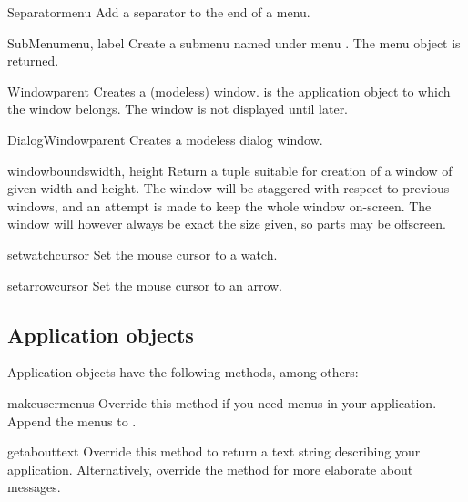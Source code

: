 \begin{funcdesc}{Separator}{menu}
Add a separator to the end of a menu.
\end{funcdesc}

\begin{funcdesc}{SubMenu}{menu, label}
Create a submenu named  under menu . The menu
object is returned.
\end{funcdesc}

\begin{funcdesc}{Window}{parent}
Creates a (modeless) window.  is the application object to
which the window belongs. The window is not displayed until later.
\end{funcdesc}

\begin{funcdesc}{DialogWindow}{parent}
Creates a modeless dialog window.
\end{funcdesc}

\begin{funcdesc}{windowbounds}{width, height}
Return a  tuple suitable for creation
of a window of given width and height. The window will be staggered
with respect to previous windows, and an attempt is made to keep the
whole window on-screen. The window will however always be exact the
size given, so parts may be offscreen.
\end{funcdesc}

\begin{funcdesc}{setwatchcursor}{}
Set the mouse cursor to a watch.
\end{funcdesc}

\begin{funcdesc}{setarrowcursor}{}
Set the mouse cursor to an arrow.
\end{funcdesc}

\subsection{Application objects}
Application objects have the following methods, among others:


\begin{funcdesc}{makeusermenus}{}
Override this method if you need menus in your application. Append the
menus to .
\end{funcdesc}

\begin{funcdesc}{getabouttext}{}
Override this method to return a text string describing your
application. Alternatively, override the  method for
more elaborate about messages.
\end{funcdesc}

